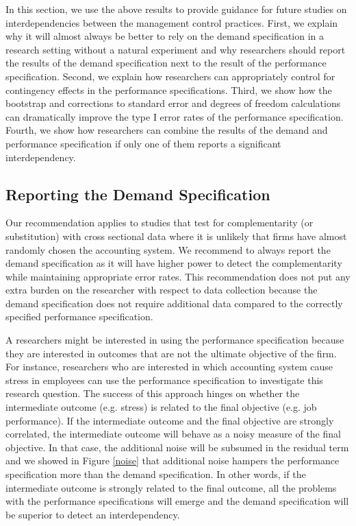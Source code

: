 \documentclass[12pt]{article}
\begin{document}
In this section, we use the above results to provide guidance for future studies on interdependencies between the management control practices. First, we explain why it will almost always be better to rely on the demand specification in a research setting without a natural experiment and why researchers should report the results of the demand specification next to the result of the performance specification. Second, we explain how researchers can appropriately control for contingency effects in the performance specifications. Third, we show how the bootstrap and corrections to standard error and degrees of freedom calculations can dramatically improve the type I error rates of the performance specification. Fourth, we show how researchers can combine the results of the demand and performance specification if only one of them reports a significant interdependency.

\subsection{Reporting the Demand Specification}

Our recommendation applies to studies that test for complementarity (or substitution) with cross sectional data where it is unlikely that firms have almost randomly chosen the accounting system. We recommend to always report the demand specification as it will have higher power to detect the complementarity while maintaining appropriate error rates. This recommendation does not put any extra burden on the researcher with respect to data collection because the demand specification does not require additional data compared to the correctly specified performance specification. 

A researchers might be interested in using the performance specification because they are interested in outcomes that are not the ultimate objective of the firm. For instance, researchers who are interested in which accounting system cause stress in employees \citep{shields_design_2000} can use the performance specification to investigate this research question. The success of this approach hinges on whether the intermediate outcome (e.g. stress) is related to the final objective (e.g. job performance). If the intermediate outcome and the final objective are strongly correlated, the intermediate outcome will behave as a noisy measure of the final objective. In that case, the additional noise will be subsumed in the residual term and we showed in Figure \ref{noise} that additional noise hampers the performance specification more than the demand specification. In other words, if the intermediate outcome is strongly related to the final outcome, all the problems with the performance specifications will emerge and the demand specification will be superior to detect an interdependency.
\end{document}
